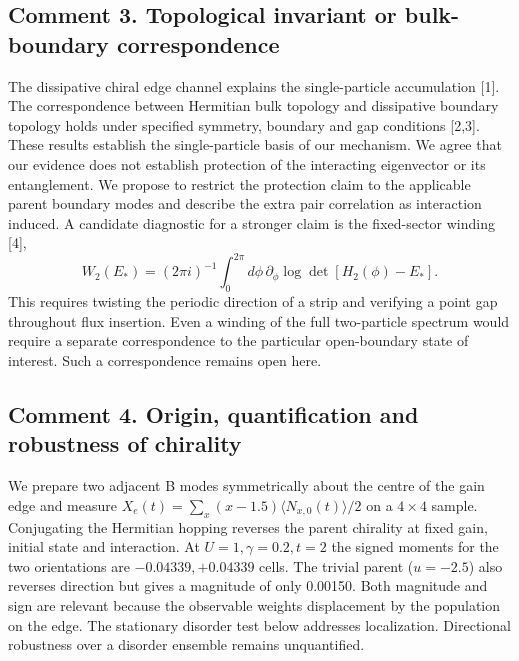 \documentclass[11pt]{article}
\newcommand{\issue}[2]{\subsection*{Comment #1. #2}}
\begin{document}
\issue{3}{Topological invariant or bulk-boundary correspondence}
The dissipative chiral edge channel explains the single-particle accumulation [1]. The correspondence between Hermitian bulk topology and dissipative boundary topology holds under specified symmetry, boundary and gap conditions [2,3]. These results establish the single-particle basis of our mechanism. We agree that our evidence does not establish protection of the interacting eigenvector or its entanglement. We propose to restrict the protection claim to the applicable parent boundary modes and describe the extra pair correlation as interaction induced. A candidate diagnostic for a stronger claim is the fixed-sector winding [4],
\[
W_2(E_*)=(2\pi i)^{-1}\int_0^{2\pi}d\phi\,\partial_\phi\log\det[H_2(\phi)-E_*].
\]
This requires twisting the periodic direction of a strip and verifying a point gap throughout flux insertion. Even a winding of the full two-particle spectrum would require a separate correspondence to the particular open-boundary state of interest. Such a correspondence remains open here.

\issue{4}{Origin, quantification and robustness of chirality}
We prepare two adjacent B modes symmetrically about the centre of the gain edge and measure $X_e(t)=\sum_x(x-1.5)\langle N_{x,0}(t)\rangle/2$ on a $4\times4$ sample. Conjugating the Hermitian hopping reverses the parent chirality at fixed gain, initial state and interaction. At $U=1,\gamma=0.2,t=2$ the signed moments for the two orientations are $-0.04339,+0.04339$ cells. The trivial parent ($u=-2.5$) also reverses direction but gives a magnitude of only 0.00150. Both magnitude and sign are relevant because the observable weights displacement by the population on the edge. The stationary disorder test below addresses localization. Directional robustness over a disorder ensemble remains unquantified.
\end{document}

